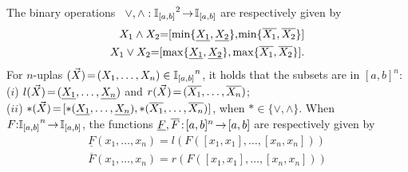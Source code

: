 \documentclass[12pt]{article}
\theoremstyle{plain}
\theoremstyle{remark}
\theoremstyle{definition}
\theoremstyle{proposition}
\newcommand{\lra}{\hspace{-0.05cm}\rightarrow\hspace{-0.05cm}}
\newcommand{\II}{\mathbb{I} }
\begin{document}
The binary operations \mbox{ $\vee, \wedge: {\II_{[a,b]}}^2 \hspace{-0.05cm}\rightarrow\hspace{-0.05cm} \II_{[a,b]}$} are  respectively given by
\begin{eqnarray}
X_1 \wedge X_2 \hspace{-0.1cm}=\hspace{-0.1cm} [\min\{\underline{X_1},\underline{X_2}\},\hspace{-0.05cm} \min\{\overline{X_1},\overline{X_2}\}] \\
X_1\vee X_2 \hspace{-0.1cm}=\hspace{-0.1cm} [\max\{\underline{X_1},\underline{X_2}\}, \max\{\overline{X_1},\overline{X_2}\}].
\end{eqnarray}
For $n$-uplas $(\vec{X})\hspace{-0.05cm}=\hspace{-0.05cm}(X_1, \ldots, X_n) \in {\mathbb{I}_{[a,b]}}^n$, it holds that the subsets are in $[a,b]^n$: \\($i$) $l(\vec{X})\hspace{-0.05cm}=\hspace{-0.05cm}(\underline{X_1}, \ldots, \underline{X_n})$ and $r(\vec{X})\hspace{-0.05cm}=\hspace{-0.05cm}(\overline{X_1}, \ldots, \overline{X_n})$; \\($ii$) $\ast(\vec{X})\hspace{-0.05cm}=\hspace{-0.05cm}[\ast(\underline{X_1}, \ldots, \underline{X_n}), \ast(\overline{X_1}, \ldots, \overline{X_n})]$, when $\ast \in \{\vee, \wedge\}$.
When $F\hspace{-0.1cm}:\hspace{-0.1cm}{\mathbb{I}_{[a,b]}}^n\lra \mathbb{I}_{[a,b]}$, the functions $\underline{F},\overline{F}\hspace{-0.05cm}:\hspace{-0.05cm}[a,b]^n\lra [a,b]$ are respectively given by \begin{eqnarray}
\underline{F}(x_1,\ldots,x_n) =l(F([x_1,x_1],\ldots,[x_n,x_n]))\\
\overline{F}(x_1,\ldots,x_n)=r(F([x_1,x_1],\ldots,[x_n,x_n]))
\end{eqnarray}
\end{document}
